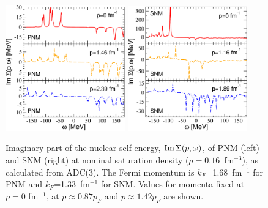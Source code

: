 \begin{figure}[tb]
\begin{center}
\includegraphics[width=0.46\textwidth]{Chapter11-figures/imag_self_energy_pnm.pdf}  \hspace{0.06\textwidth}
\includegraphics[width=0.46\textwidth]{Chapter11-figures/imag_self_energy_snm.pdf}
\caption{Imaginary part of the nuclear self-energy, ${\rm Im} \, \Sigma(p,\omega)$, of PNM (left) and SNM (right) at nominal saturation density ($\rho=0.16$~fm$^{-3}$), as calculated from  ADC(3).  The Fermi momentum is $k_F$=1.68~fm$^{-1}$ for PNM and $k_F$=1.33~fm$^{-1}$ for SNM. Values for  momenta fixed at  $p=0$ fm$^{-1}$, at  $p\approx0.87p_F$ and $p\approx1.42p_F$ are shown. }
\label{fig:minn_ImSE}
\end{center}
\end{figure}

